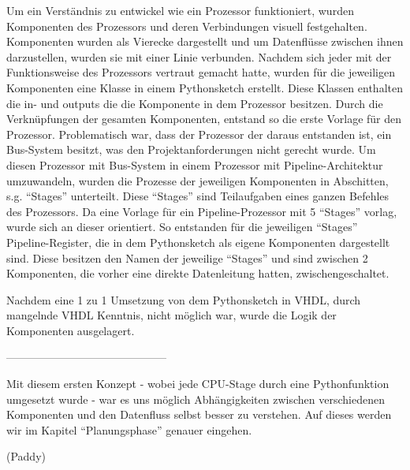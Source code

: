 \documentclass[paper=a4,fontsize=12pt,twocolumn]{scrreprt}
\begin{document}
Um ein Verständnis zu entwickel wie ein Prozessor funktioniert, wurden Komponenten des Prozessors und deren Verbindungen visuell festgehalten. 
Komponenten wurden als Vierecke dargestellt und um Datenflüsse zwischen ihnen darzustellen, wurden sie mit einer Linie verbunden.
Nachdem sich jeder mit der Funktionsweise des Prozessors vertraut gemacht hatte, wurden für die jeweiligen Komponenten eine Klasse in einem Pythonsketch erstellt.
Diese Klassen enthalten die in- und outputs die die Komponente in dem Prozessor besitzen.
Durch die Verknüpfungen der gesamten Komponenten, entstand so die erste Vorlage für den Prozessor. 
Problematisch war, dass der Prozessor der daraus entstanden ist, ein Bus-System besitzt, was den Projektanforderungen nicht gerecht wurde. 
Um diesen Prozessor mit Bus-System in einem Prozessor mit Pipeline-Architektur umzuwandeln, wurden die Prozesse der jeweiligen Komponenten in Abschitten, s.g. \enquote{Stages} unterteilt.
Diese \enquote{Stages} sind Teilaufgaben eines ganzen Befehles des Prozessors. 
Da eine Vorlage für ein Pipeline-Prozessor mit 5 \enquote{Stages} vorlag, wurde sich an dieser orientiert.
So entstanden für die jeweiligen \enquote{Stages} Pipeline-Register, die in dem Pythonsketch als eigene Komponenten dargestellt sind.
Diese besitzen den Namen der jeweilige \enquote{Stages} und sind zwischen 2 Komponenten, die vorher eine direkte Datenleitung hatten, zwischengeschaltet.

Nachdem eine 1 zu 1 Umsetzung von dem Pythonsketch in VHDL, durch mangelnde VHDL Kenntnis, nicht möglich war, wurde die Logik der Komponenten ausgelagert.



--------------------------------------------

Mit diesem ersten Konzept - wobei jede CPU-Stage durch eine Pythonfunktion umgesetzt wurde - war es uns möglich Abhängigkeiten zwischen verschiedenen Komponenten und den Datenfluss selbst besser zu verstehen.
Auf dieses werden wir im Kapitel \enquote{Planungsphase} genauer eingehen.


(Paddy)
\end{document}
